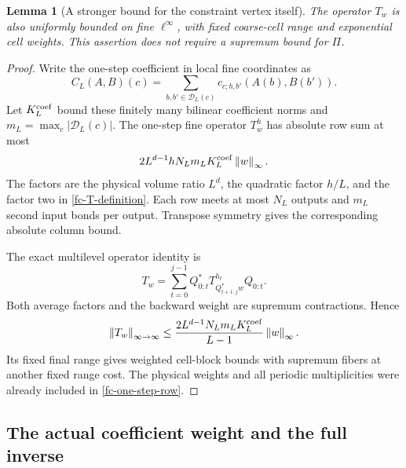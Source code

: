 \documentclass[11pt]{article}
\newtheorem{lemma}[theorem]{Lemma}
\theoremstyle{remark}\newtheorem{remark}[theorem]{Remark}
\newcommand{\norm}[1]{\left\lVert#1\right\rVert}
\begin{document}
\begin{lemma}[A stronger bound for the constraint vertex itself]
\label{fc-T-supremum}
The operator $T_w$ is also uniformly bounded on fine
$\ell^\infty$, with fixed coarse-cell range and exponential cell
weights. This assertion does not require a supremum bound for
$\Pi$.
\end{lemma}

\begin{proof}
Write the one-step coefficient in local fine coordinates as
\[
 C_L(A,B)(c)=\sum_{b,b'\in\mathcal D_L(c)}
                    c_{c;b,b'}(A(b),B(b')).
\]
Let $K_L^{\rm coef}$ bound these finitely many bilinear coefficient
norms and $m_L=\max_c|\mathcal D_L(c)|$. The one-step fine
operator $T_w^h$ has absolute row sum at most
\begin{equation}
 2L^{d-1}hN_Lm_LK_L^{\rm coef}\norm{w}_\infty.
 \label{fc-one-step-row}
\end{equation}
The factors are the physical volume ratio $L^d$, the quadratic
factor $h/L$, and the factor two in
\eqref{fc-T-definition}. Each row meets at most $N_L$ outputs and
$m_L$ second input bonds per output. Transpose symmetry gives the
corresponding absolute column bound.

The exact multilevel operator identity is
\begin{equation}
 T_w=\sum_{t=0}^{j-1}Q_{0:t}^*
           T^{h_t}_{Q_{t+1:j}^*w}Q_{0:t}.
 \label{fc-T-operator-chain}
\end{equation}
Both average factors and the backward weight are supremum
contractions. Hence
\begin{equation}
 \norm{T_w}_{\infty\to\infty}
 \le \frac{2L^{d-1}N_Lm_LK_L^{\rm coef}}{L-1}
                         \norm{w}_\infty.
 \label{fc-T-supremum-bound}
\end{equation}
Its fixed final range gives weighted cell-block bounds with
supremum fibers at another fixed range cost. The physical weights
and all periodic multiplicities were already included in
\eqref{fc-one-step-row}.
\end{proof}

\subsection{The actual coefficient weight and the full inverse}
\label{fc-full-neighborhood-section}
\end{document}
